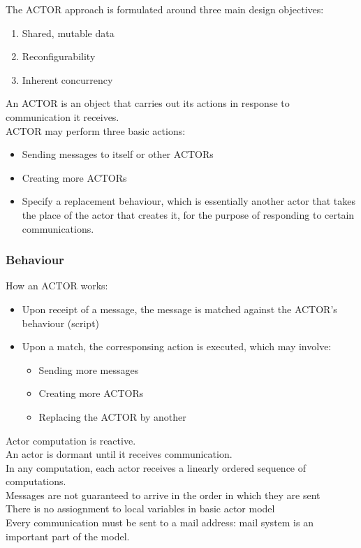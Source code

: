The ACTOR approach is formulated around three main design objectives:
\begin{enumerate}
\item Shared, mutable data
\item Reconfigurability
\item Inherent concurrency
\end{enumerate}
An ACTOR is an object that carries out its actions in response to communication it receives.\\
ACTOR may perform three basic actions:
\begin{itemize}
\item Sending messages to itself or other ACTORs
\item Creating more ACTORs
\item Specify a replacement behaviour, which is essentially another actor that takes the place of the actor that creates it, for the purpose of responding to certain communications.
\end{itemize}
\subsubsection{Behaviour}
How an ACTOR works:
\begin{itemize}
\item Upon receipt of a message, the message is matched against the ACTOR's behaviour (script)
\item Upon a match, the corresponsing action is executed, which may involve:
\begin{itemize}
\item Sending more messages
\item Creating more ACTORs
\item Replacing the ACTOR by another
\end{itemize}
\end{itemize}

Actor computation is reactive.\\
An actor is dormant until it receives communication.\\
In any computation, each actor receives a linearly ordered sequence of computations.\\
Messages are not guaranteed to arrive in the order in which they are sent\\
There is no assiognment to local variables in basic actor model\\
Every communication must be sent to a mail address: mail system is an important part of the model.
